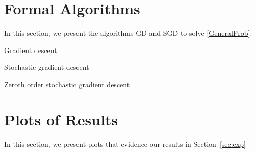\section{Formal Algorithms}\label{app:formal_algorithms}
In this section, we present the algorithms GD and SGD to solve \eqref{GeneralProb}.

\begin{algorithm}[H] 
    \caption{Gradient descent}
\end{algorithm}

\begin{algorithm}[H]
    \caption{Stochastic gradient descent}
\end{algorithm}

\begin{algorithm}[H]
    \caption{Zeroth order stochastic gradient descent}
\end{algorithm}

\section{Plots of Results}\label{app:plots}
In this section, we present plots that evidence our results in Section~\ref{sec:exp}

